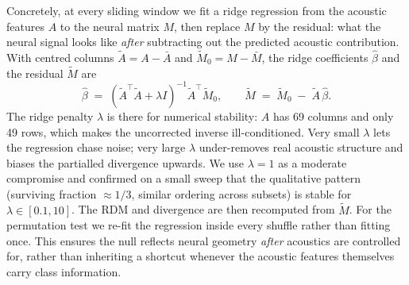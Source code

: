 \documentclass[11pt]{article}
\begin{document}
Concretely, at every sliding window we fit a ridge regression from the acoustic features $A$ to the neural matrix $M$, then replace $M$ by the residual: what the neural signal looks like \emph{after} subtracting out the predicted acoustic contribution. With centred columns $\tilde{A} = A - \bar{A}$ and $\tilde{M}_0 = M - \bar{M}$, the ridge coefficients $\hat{\beta}$ and the residual $\tilde{M}$ are
\begin{equation}
  \hat{\beta} \;=\; \left(\tilde{A}^{\!\top}\tilde{A} + \lambda I\right)^{-1}\tilde{A}^{\!\top}\tilde{M}_0,
  \qquad
  \tilde{M} \;=\; \tilde{M}_0 \;-\; \tilde{A}\,\hat{\beta}.
\end{equation}
The ridge penalty $\lambda$ is there for numerical stability: $A$ has 69 columns and only 49 rows, which makes the uncorrected inverse ill-conditioned. Very small $\lambda$ lets the regression chase noise; very large $\lambda$ under-removes real acoustic structure and biases the partialled divergence upwards. We use $\lambda = 1$ as a moderate compromise and confirmed on a small sweep that the qualitative pattern (surviving fraction $\approx 1/3$, similar ordering across subsets) is stable for $\lambda \in [0.1, 10]$. The RDM and divergence are then recomputed from $\tilde{M}$. For the permutation test we re-fit the regression inside every shuffle rather than fitting once. This ensures the null reflects neural geometry \emph{after} acoustics are controlled for, rather than inheriting a shortcut whenever the acoustic features themselves carry class information.
\end{document}
